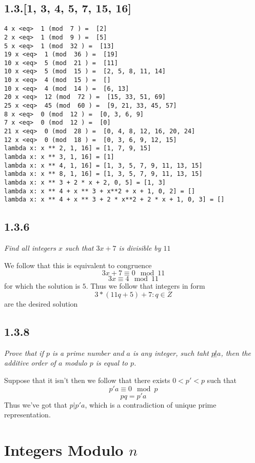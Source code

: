 \documentclass[11pt,oneside,titlepage]{book}
\begin{document}
\subsection*{1.3.[1, 3, 4, 5, 7, 15, 16]}
\begin{verbatim}
4 x <eq>  1 (mod  7 ) =  [2]
2 x <eq>  1 (mod  9 ) =  [5]
5 x <eq>  1 (mod  32 ) =  [13]
19 x <eq>  1 (mod  36 ) =  [19]
10 x <eq>  5 (mod  21 ) =  [11]
10 x <eq>  5 (mod  15 ) =  [2, 5, 8, 11, 14]
10 x <eq>  4 (mod  15 ) =  []
10 x <eq>  4 (mod  14 ) =  [6, 13]
20 x <eq>  12 (mod  72 ) =  [15, 33, 51, 69]
25 x <eq>  45 (mod  60 ) =  [9, 21, 33, 45, 57]
8 x <eq>  0 (mod  12 ) =  [0, 3, 6, 9]
7 x <eq>  0 (mod  12 ) =  [0]
21 x <eq>  0 (mod  28 ) =  [0, 4, 8, 12, 16, 20, 24]
12 x <eq>  0 (mod  18 ) =  [0, 3, 6, 9, 12, 15]
lambda x: x ** 2, 1, 16] = [1, 7, 9, 15]
lambda x: x ** 3, 1, 16] = [1]
lambda x: x ** 4, 1, 16] = [1, 3, 5, 7, 9, 11, 13, 15]
lambda x: x ** 8, 1, 16] = [1, 3, 5, 7, 9, 11, 13, 15]
lambda x: x ** 3 + 2 * x + 2, 0, 5] = [1, 3]
lambda x: x ** 4 + x ** 3 + x**2 + x + 1, 0, 2] = []
lambda x: x ** 4 + x ** 3 + 2 * x**2 + 2 * x + 1, 0, 3] = []
\end{verbatim}


\subsection*{1.3.6}

\textit{Find all integers $x$ such that $3x + 7$ is divisible by $11$}

We follow that this is equivalent to congruence
$$3x + 7 \equiv 0 \mod{11}$$
$$3x  \equiv 4 \mod{11}$$
for which the solution is $5$. Thus we follow that integers in form
$$3 * (11q + 5) + 7: q \in Z$$
are the desired solution

\subsection*{1.3.8}

\textit{Prove that if $p$ is a prime number and $a$ is any integer, such taht $p \not | a$,
  then the additive order of $a$ modulo $p$ is equal to $p$.}

Suppose that it isn't then we follow that there exists $0 < p' < p$ such that
$$p' a \equiv 0 \mod{p}$$
$$pq = p'a$$
Thus we've got that $p | p'a$, which is a contradiction of unique prime representation.

\section{Integers Modulo $n$}
\end{document}
